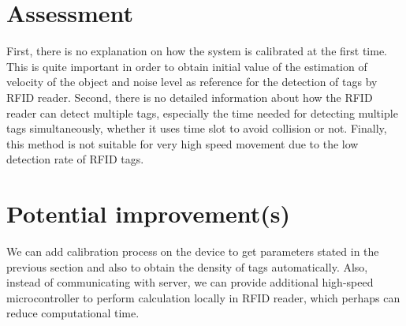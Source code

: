 \documentclass [a4,11pt]{article}
\begin{document}
\section{Assessment}
First, there is no explanation on how the system is calibrated at the first time. This is quite important in order to obtain initial value of the estimation of velocity of the object and noise level as reference for the detection of tags by RFID reader. Second, there is no detailed information about how the RFID reader can detect multiple tags, especially the time needed for detecting multiple tags simultaneously, whether it uses time slot to avoid collision or not. Finally, this method is not suitable for very high speed movement due to the low detection rate of RFID tags.

\section{Potential improvement(s)}
We can add calibration process on the device to get parameters stated in the previous section and also to obtain the density of tags automatically. Also, instead of communicating with server, we can provide additional high-speed microcontroller to perform calculation locally in RFID reader, which perhaps can reduce computational time.  
\end{document}

